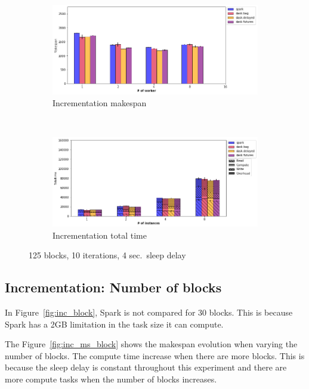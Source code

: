 \documentclass[conference]{IEEEtran}
\begin{document}
\begin{figure}[!b]
    \centering
    \begin{subfigure}[b]{\columnwidth}
        \includegraphics[clip,width=\columnwidth]{images/inc_worker.png}%
        \caption{Incrementation makespan}\label{fig:inc_ms_worker}
    \end{subfigure}
    \\
    \begin{subfigure}[b]{\columnwidth}
        \includegraphics[clip,width=\columnwidth]{images/inc_idle_worker.png}%
        \caption{Incrementation total time}\label{fig:inc_tt_worker}
    \end{subfigure}
    \caption{125 blocks, 10 iterations, 4 sec.\ sleep delay}\label{fig:inc_worker}
\end{figure}

\subsection{Incrementation: Number of blocks}
In Figure~\ref{fig:inc_block}, Spark is not compared for 30 blocks. This is because
Spark has a 2GB limitation in the task size it can compute.

The Figure~\ref{fig:inc_ms_block} shows the makespan evolution when varying the
number of blocks. The compute time increase when there are more blocks. This is
because the sleep delay is constant throughout this experiment and there are more
compute tasks when the number of blocks increases.
\end{document}
